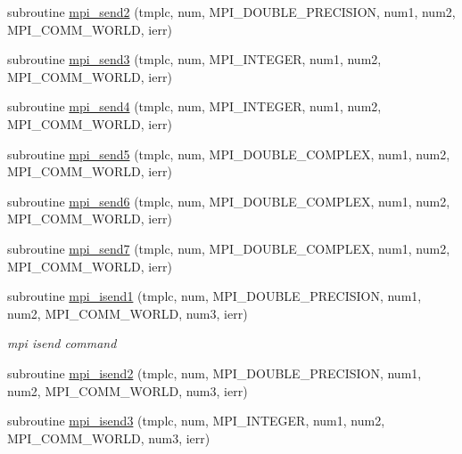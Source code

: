 \begin{DoxyCompactItemize}
subroutine \mbox{\hyperlink{namespacempistub_a6c4e68898245f7cb86fa2854a852a0e4}{mpi\+\_\+send2}} (tmplc, num, M\+P\+I\+\_\+\+D\+O\+U\+B\+L\+E\+\_\+\+P\+R\+E\+C\+I\+S\+I\+ON, num1, num2, M\+P\+I\+\_\+\+C\+O\+M\+M\+\_\+\+W\+O\+R\+LD, ierr)
\item 
subroutine \mbox{\hyperlink{namespacempistub_aa2236bd3615856981e15e75fd85bce13}{mpi\+\_\+send3}} (tmplc, num, M\+P\+I\+\_\+\+I\+N\+T\+E\+G\+ER, num1, num2, M\+P\+I\+\_\+\+C\+O\+M\+M\+\_\+\+W\+O\+R\+LD, ierr)
\item 
subroutine \mbox{\hyperlink{namespacempistub_a1c957856f9f59c126b5a38101eb016b2}{mpi\+\_\+send4}} (tmplc, num, M\+P\+I\+\_\+\+I\+N\+T\+E\+G\+ER, num1, num2, M\+P\+I\+\_\+\+C\+O\+M\+M\+\_\+\+W\+O\+R\+LD, ierr)
\item 
subroutine \mbox{\hyperlink{namespacempistub_a46c983917eca3492fa5ad9eadbb25b2e}{mpi\+\_\+send5}} (tmplc, num, M\+P\+I\+\_\+\+D\+O\+U\+B\+L\+E\+\_\+\+C\+O\+M\+P\+L\+EX, num1, num2, M\+P\+I\+\_\+\+C\+O\+M\+M\+\_\+\+W\+O\+R\+LD, ierr)
\item 
subroutine \mbox{\hyperlink{namespacempistub_a1a0436836f0028c31fba295fbbe17859}{mpi\+\_\+send6}} (tmplc, num, M\+P\+I\+\_\+\+D\+O\+U\+B\+L\+E\+\_\+\+C\+O\+M\+P\+L\+EX, num1, num2, M\+P\+I\+\_\+\+C\+O\+M\+M\+\_\+\+W\+O\+R\+LD, ierr)
\item 
subroutine \mbox{\hyperlink{namespacempistub_a572c98a51712ea28686e837f62e0a660}{mpi\+\_\+send7}} (tmplc, num, M\+P\+I\+\_\+\+D\+O\+U\+B\+L\+E\+\_\+\+C\+O\+M\+P\+L\+EX, num1, num2, M\+P\+I\+\_\+\+C\+O\+M\+M\+\_\+\+W\+O\+R\+LD, ierr)
\item 
subroutine \mbox{\hyperlink{namespacempistub_a2aebc613876246484fb3daea092c2abe}{mpi\+\_\+isend1}} (tmplc, num, M\+P\+I\+\_\+\+D\+O\+U\+B\+L\+E\+\_\+\+P\+R\+E\+C\+I\+S\+I\+ON, num1, num2, M\+P\+I\+\_\+\+C\+O\+M\+M\+\_\+\+W\+O\+R\+LD, num3, ierr)
\begin{DoxyCompactList}\small\item\em mpi isend command \end{DoxyCompactList}\item 
subroutine \mbox{\hyperlink{namespacempistub_ac35bd42a69c258e2cc6e8db36212b3aa}{mpi\+\_\+isend2}} (tmplc, num, M\+P\+I\+\_\+\+D\+O\+U\+B\+L\+E\+\_\+\+P\+R\+E\+C\+I\+S\+I\+ON, num1, num2, M\+P\+I\+\_\+\+C\+O\+M\+M\+\_\+\+W\+O\+R\+LD, num3, ierr)
\item 
subroutine \mbox{\hyperlink{namespacempistub_a47d130d2122c960528cefcdd0295e596}{mpi\+\_\+isend3}} (tmplc, num, M\+P\+I\+\_\+\+I\+N\+T\+E\+G\+ER, num1, num2, M\+P\+I\+\_\+\+C\+O\+M\+M\+\_\+\+W\+O\+R\+LD, num3, ierr)

\end{DoxyCompactItemize}
